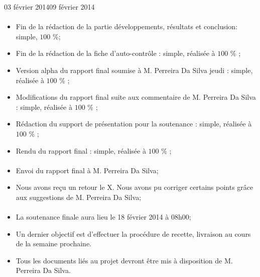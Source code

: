 \documentclass[12pt]{fiche-rd-info}
\begin{document}
\begin{fichesuivi}{03 février 2014}{09 février 2014}
\paragraph{}
	\begin{travaileffectue}
		\begin{itemize}
			\item  Fin de la rédaction de la partie développements, résultats et conclusion: simple, $100$ \%;
			\item Fin de la rédaction de la fiche d’auto-contrôle  : simple, réalisée à $100$ \% ;
			\item Version alpha du rapport final soumise à M. Perreira Da Silva jeudi :  simple, réalisée à $100$ \% ;
			\item Modifications du rapport final suite aux commentaire de   M. Perreira Da Silva : simple, réalisée à $100$ \% ;
			\item Rédaction du support de présentation pour la soutenance : simple, réalisée à $100$ \% ;
			\item Rendu du rapport final : simple, réalisée à $100$ \% ;
		\end{itemize}
	\end{travaileffectue}


\paragraph{}
	\begin{echange}
		\begin{itemize}
			\item Envoi du rapport final à M. Perreira Da Silva;
			\item Nous avons reçu un retour le X. Nous avons pu corriger certains points grâce aux suggestions de M. Perreira Da Silva;
		\end{itemize}
	\end{echange}

\paragraph*{}
	\begin{planification}
		\begin{itemize}
			\item La soutenance finale aura lieu le 18 février 2014 à 08h00;
			\item Un dernier objectif est d’effectuer la procédure de recette, livraison au cours de la semaine prochaine.
			\item Tous les documents liés au projet devront être mis à disposition de M. Perreira Da Silva.
\end{itemize}
	\end{planification}
\end{fichesuivi}
\end{document}
